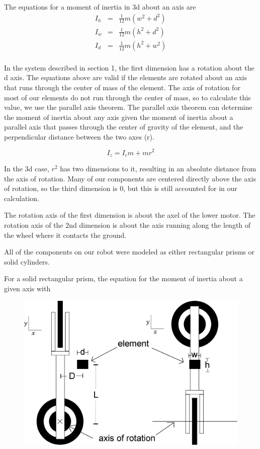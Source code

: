 \documentclass{article}
\begin{document}
The equations for a moment of inertia in 3d about an axis are 
\begin{eqnarray}
I_{h} &=& \frac{1}{12} m(w^2 + d^2) \nonumber \\
I_{w} &=& \frac{1}{12} m(h^2 + d^2) \nonumber \\
I_{d} &=& \frac{1}{12} m(h^2 + w^2) \nonumber \\
\end{eqnarray}

In the system described in section 1, the first dimension has a rotation about the d axis.  The equations above are valid if the elements are rotated about an axis that runs through the center of mass of the element.  The axis of rotation for most of our elements do not run through the center of mass, so to calculate this value, we use the parallel axis theorem.  The parallel axis theorem can determine the moment of inertia about any axis given the moment of inertia about a parallel axis that passes through the center of gravity of the element, and the perpendicular distance between the two axes (r).  

\begin{equation}
I_{z} = I_cm + mr^2
\end{equation}
 
In the 3d case, $r^2$ has two dimensions to it, resulting in an absolute distance from the axis of rotation.  Many of our components are centered directly above the axis of rotation, so the third dimension is 0, but this is still accounted for in our calculation.

The rotation axis of the first dimension is about the axel of the lower motor.  The rotation axis of the 2nd dimension is about the axis running along the length of the wheel where it contacts the ground.

All of the components on our robot were modeled as either rectangular prisms or solid cylinders.


For a solid rectangular prism, the equation for the moment of inertia about a given axis with 

\begin{figure}
\centering
\includegraphics[scale=0.5]{momentOfInertiaDiagram}
\end{figure}
\end{document}
